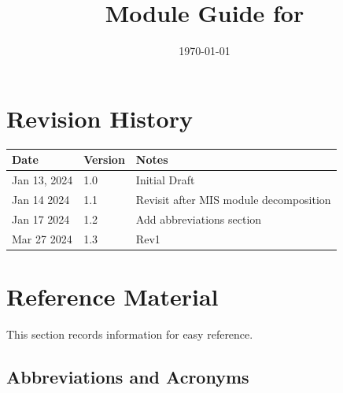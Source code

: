 \documentclass[12pt, titlepage]{article}
\begin{document}
\title{Module Guide for \progname{}} 
\author{\authname}
\date{\today}

\maketitle


\section{Revision History}

\begin{tabularx}{\textwidth}{p{3cm}p{2cm}X}
\toprule {\bf Date} & {\bf Version} & {\bf Notes}\\
\midrule
Jan 13, 2024 & 1.0 & Initial Draft\\
Jan 14 2024 & 1.1 & Revisit after MIS module decomposition\\
Jan 17 2024 & 1.2 & Add abbreviations section\\
Mar 27 2024 & 1.3 & Rev1\\
\bottomrule
\end{tabularx}

\newpage

\section{Reference Material}

This section records information for easy reference.

\subsection{Abbreviations and Acronyms}
\end{document}
